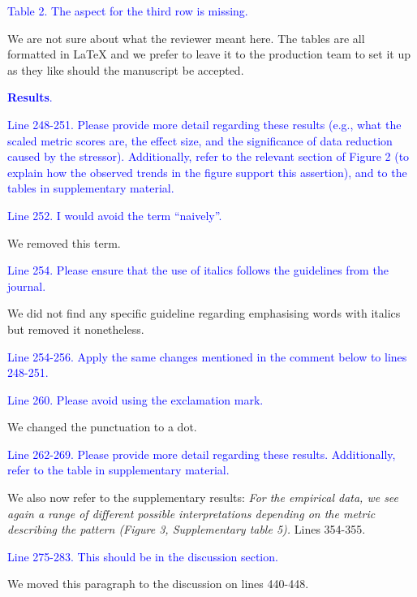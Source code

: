 \documentclass[
]{article}
\begin{document}
\textcolor{blue}{Table 2. The aspect for the third row is missing.}

We are not sure about what the reviewer meant here.
The tables are all formatted in LaTeX and we prefer to leave it to the production team to set it up as they like should the manuscript be accepted.

\textcolor{blue}{\textbf{Results}.}

\textcolor{blue}{Line 248-251. Please provide more detail regarding these results (e.g., what the scaled metric scores are, the effect size, and the significance of data reduction caused by the stressor). Additionally, refer to the relevant section of Figure 2 (to explain how the observed trends in the figure support this assertion), and to the tables in supplementary material.}


\textcolor{blue}{Line 252. I would avoid the term ``naively''.}

We removed this term.

\textcolor{blue}{Line 254. Please ensure that the use of italics follows the guidelines from the journal.}

We did not find any specific guideline regarding emphasising words with italics but removed it nonetheless.

\textcolor{blue}{Line 254-256. Apply the same changes mentioned in the comment below to lines 248-251.}

\textcolor{blue}{Line 260. Please avoid using the exclamation mark.}

We changed the punctuation to a dot.

\textcolor{blue}{Line 262-269. Please provide more detail regarding these results. Additionally, refer to the table in supplementary material.}


We also now refer to the supplementary results:
\textit{For the empirical data, we see again a range of different possible interpretations depending on the metric describing the pattern (Figure 3, Supplementary table 5).}
Lines 354-355.

\textcolor{blue}{Line 275-283. This should be in the discussion section.}

We moved this paragraph to the discussion on lines 440-448.
\end{document}
